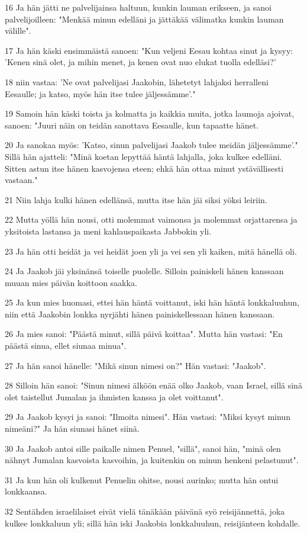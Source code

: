 \par 16 Ja hän jätti ne palvelijainsa haltuun, kunkin lauman erikseen, ja sanoi palvelijoilleen: "Menkää minun edelläni ja jättäkää välimatka kunkin lauman välille".
\par 17 Ja hän käski ensimmäistä sanoen: "Kun veljeni Eesau kohtaa sinut ja kysyy: 'Kenen sinä olet, ja mihin menet, ja kenen ovat nuo elukat tuolla edelläsi?'
\par 18 niin vastaa: 'Ne ovat palvelijasi Jaakobin, lähetetyt lahjaksi herralleni Eesaulle; ja katso, myös hän itse tulee jäljessämme'."
\par 19 Samoin hän käski toista ja kolmatta ja kaikkia muita, jotka laumoja ajoivat, sanoen: "Juuri näin on teidän sanottava Eesaulle, kun tapaatte hänet.
\par 20 Ja sanokaa myös: 'Katso, sinun palvelijasi Jaakob tulee meidän jäljessämme'." Sillä hän ajatteli: "Minä koetan lepyttää häntä lahjalla, joka kulkee edelläni. Sitten astun itse hänen kasvojensa eteen; ehkä hän ottaa minut ystävällisesti vastaan."
\par 21 Niin lahja kulki hänen edellänsä, mutta itse hän jäi siksi yöksi leiriin.
\par 22 Mutta yöllä hän nousi, otti molemmat vaimonsa ja molemmat orjattarensa ja yksitoista lastansa ja meni kahlauspaikasta Jabbokin yli.
\par 23 Ja hän otti heidät ja vei heidät joen yli ja vei sen yli kaiken, mitä hänellä oli.
\par 24 Ja Jaakob jäi yksinänsä toiselle puolelle. Silloin painiskeli hänen kanssaan muuan mies päivän koittoon saakka.
\par 25 Ja kun mies huomasi, ettei hän häntä voittanut, iski hän häntä lonkkaluuhun, niin että Jaakobin lonkka nyrjähti hänen painiskellessaan hänen kanssaan.
\par 26 Ja mies sanoi: "Päästä minut, sillä päivä koittaa". Mutta hän vastasi: "En päästä sinua, ellet siunaa minua".
\par 27 Ja hän sanoi hänelle: "Mikä sinun nimesi on?" Hän vastasi: "Jaakob".
\par 28 Silloin hän sanoi: "Sinun nimesi älköön enää olko Jaakob, vaan Israel, sillä sinä olet taistellut Jumalan ja ihmisten kanssa ja olet voittanut".
\par 29 Ja Jaakob kysyi ja sanoi: "Ilmoita nimesi". Hän vastasi: "Miksi kysyt minun nimeäni?" Ja hän siunasi hänet siinä.
\par 30 Ja Jaakob antoi sille paikalle nimen Penuel, "sillä", sanoi hän, "minä olen nähnyt Jumalan kasvoista kasvoihin, ja kuitenkin on minun henkeni pelastunut".
\par 31 Ja kun hän oli kulkenut Penuelin ohitse, nousi aurinko; mutta hän ontui lonkkaansa.
\par 32 Sentähden israelilaiset eivät vielä tänäkään päivänä syö reisijännettä, joka kulkee lonkkaluun yli; sillä hän iski Jaakobia lonkkaluuhun, reisijänteen kohdalle.

